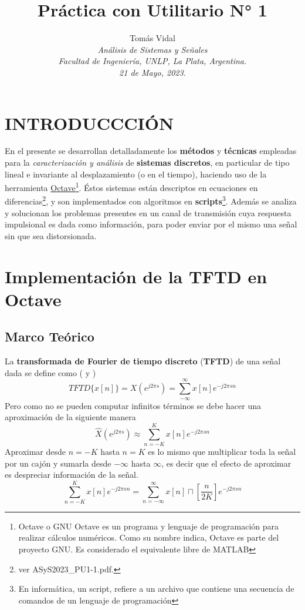 \documentclass[letterpaper, 10 pt, conference]{ieeeconf}  %
\title{\LARGE \bf Pr\'actica con Utilitario N° 1}
\author{
  Tom\'as Vidal\\
  {\it An\'alisis de Sistemas y Se\~{n}ales}\\
  {\it Facultad de Ingenier\'ia, UNLP, La Plata, Argentina.}\\
  {\it 21 de Mayo, 2023.}
}
\begin{document}
\maketitle
\thispagestyle{empty}
\pagestyle{empty}

\section{INTRODUCCCI\'ON}
En el presente se desarrollan detalladamente los \textbf{m\'etodos} y \textbf{t\'ecnicas} empleadas para la \textit{caracterizaci\'on y an\'alisis} de \textbf{sistemas discretos}, en particular de tipo lineal e invariante al desplazamiento (o en el tiempo), haciendo uso de la herramienta \href{https://octave.org/}{Octave}\footnote{Octave o GNU Octave es un programa y lenguaje de programaci\'on para realizar c\'alculos num\'ericos. Como su nombre indica, Octave es parte del proyecto GNU. Es considerado el equivalente libre de MATLAB}. \'Estos sistemas est\'an descriptos en ecuaciones en diferencias\footnote{ver ASyS2023\_PU1-1.pdf.}, y son implementados con algoritmos en \textbf{scripts}\footnote{En inform\'atica, un script, refiere a un archivo que contiene una secuencia de comandos de un lenguaje de programaci\'on}. Adem\'as se analiza y solucionan los problemas presentes en un canal de transmisi\'on cuya respuesta impulsional es dada como informaci\'on, para poder enviar por el mismo una se\~nal sin que sea distorsionada.

\section{Implementaci\'on de la \textbf{TFTD} en Octave}
\subsection{Marco Te\'orico} \label{subsec:TFTD}
La \textbf{transformada de Fourier de tiempo discreto} (\textbf{TFTD}) de una se\~{n}al dada se define como (\cite{bib:tftd_tp5} y \cite{bib:tftd_teoria})
\[
  TFTD\{x[n]\} = X(e^{j2{\pi}s}) = \sum_{-\infty}^{\infty}{x[n]e^{-j2{\pi}sn}}
\]
Pero como no se pueden computar infinitos t\'erminos se debe hacer una aproximaci\'on de la siguiente manera
\[
  \hat{X}(e^{j2{\pi}s}) \approx \sum_{n=-K}^{K}{x[n]e^{-j2{\pi}sn}}
\]
Aproximar desde $n=-K$ hasta $n=K$ es lo mismo que multiplicar toda la se\~nal por un caj\'on y sumarla desde $-\infty$ hasta $\infty$, es decir que el efecto de aproximar es despreciar informaci\'on de la se\~nal.
\[
  \sum_{n=-K}^{K}{x[n]e^{-j2{\pi}sn}} = \sum_{n=-\infty}^{\infty}{x[n]\sqcap[\frac{n}{2K}]e^{-j2{\pi}sn}}
\]
\end{document}
